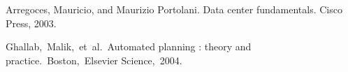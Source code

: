\documentclass[letterpaper]{article}
\begin{document}
\begin{thebibliography}{}

 Arregoces, Mauricio, and Maurizio Portolani. Data center fundamentals. Cisco Press, 2003.

 Ghallab, Malik, et al. Automated planning : theory and practice. Boston, Elsevier Science, 2004.

\end{thebibliography}
\end{document}
